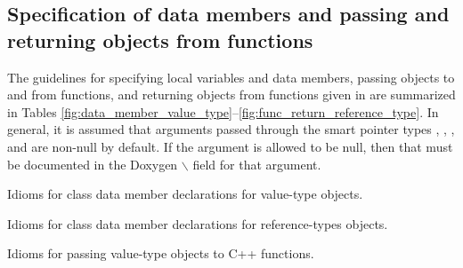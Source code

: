%
\subsection{Specification of data members and passing and returning
  objects from functions}
\label{sec:func_arguments}
%

The guidelines for specifying local variables and data members,
passing objects to and from functions, and returning objects from
functions given in \cite{TeuchosMemoryManagementGuide} are summarized
in Tables
\ref{fig:data_member_value_type}--\ref{fig:func_return_reference_type}.
In general, it is assumed that arguments passed through the smart
pointer types , , , and
 are non-null by default.  If the argument is allowed to
be null, then that must be documented in the Doxygen
$\backslash$ field for that argument.


\begin{table}
%
\begin{center}
%
%

%
%
\end{center}
\caption{\label{fig:data_member_value_type}
Idioms for class data member declarations for value-type objects.}
%
\end{table}


\begin{table}
%
\begin{center}
%
%

%
%
\end{center}
\caption{\label{fig:data_member_reference_type}
Idioms for class data member declarations for reference-types
objects.}
%
\end{table}


\begin{table}[p]
%
\begin{center}
%
%

%
%
%
\end{center}
\caption{\label{fig:func_args_value_type}
Idioms for passing value-type objects to C++ functions.}
%
\end{table}


